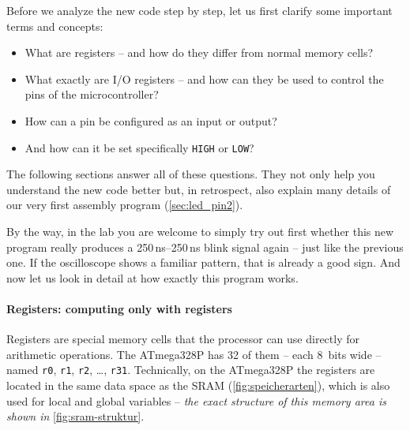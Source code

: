 \documentclass[a4paper,12pt]{article}
\begin{document}
\medskip
\noindent
Before we analyze the new code step by step, let us first clarify some
important terms and concepts:

\begin{itemize}
    \item
	What are registers – and how do they differ from normal memory
	cells?
    \item
	What exactly are I/O registers – and how can they be used to control
	the pins of the microcontroller?
    \item
	How can a pin be configured as an input or output?
    \item
	And how can it be set specifically \texttt{HIGH} or \texttt{LOW}?
\end{itemize}
\noindent
The following sections answer all of these questions. They not only help you
understand the new code better but, in retrospect, also explain many details
of our very first assembly program (\autoref{sec:led_pin2}).

By the way, in the lab you are welcome to simply try out first whether this
new program really produces a 250\,ns–250\,ns blink signal again – just like
the previous one. If the oscilloscope shows a familiar pattern, that is
already a good sign. And now let us look in detail at how exactly this
program works.

\paragraph{Registers: computing only with registers}

Registers are special memory cells that the processor can use directly for
arithmetic operations. The ATmega328P has 32 of them – each 8~bits wide –
named \texttt{r0}, \texttt{r1}, \texttt{r2}, \dots, \texttt{r31}.
Technically, on the ATmega328P the registers are located in the same data
space as the SRAM (\autoref{fig:speicherarten}), which is also used for
local and global variables – \textit{the exact structure of this memory area
is shown in} \autoref{fig:sram-struktur}.
\end{document}
